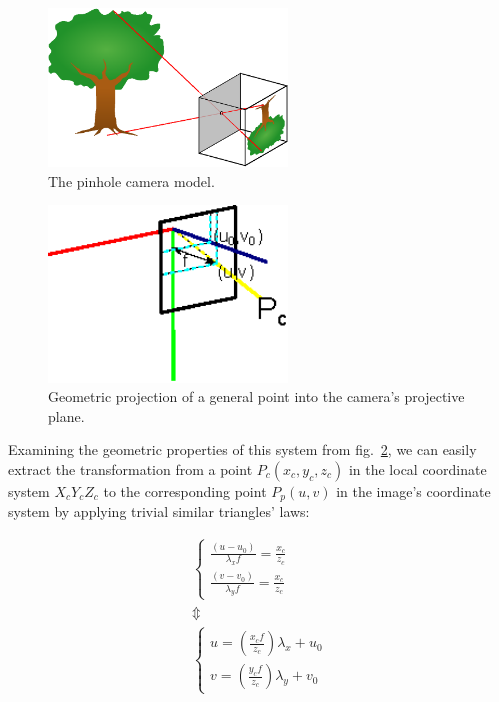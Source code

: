 \begin{figure}[htbp]
\centering
\includegraphics[width=2.5in]{./Graphics/pinhole_camera}
\caption{The pinhole camera model. \label{fig:pinhole_camera}}
\end{figure}
\begin{figure}[htbp]
\centering
\includegraphics[width=2.5in]{./Graphics/camera_intrinsics}
\caption{Geometric projection of a general point into the camera's projective
plane. \label{fig:intrinsics}}
\end{figure}
Examining the geometric properties of this system from fig.~\ref{fig:intrinsics}, we can easily extract the
transformation from a point $P_c(x_c,y_c,z_c)$ in the local coordinate system
$X_cY_cZ_c$ to the corresponding point $P_p(u,v)$ in the image's coordinate
system by applying trivial similar triangles' laws:

\[
  \begin{array}{c}
    \left\{\begin{array}{c}
    \frac{(u-u_0)}{\lambda _x f}=\frac{x_c}{z_c} \\
    \frac{(v-v_0)}{\lambda _y f}=\frac{x_c}{z_c}
  \end{array}
  \right. \\
  \Updownarrow \\
  \left\{\begin{array}{c}
      u=\left(\frac{x_c f}{z_c}\right) \lambda _x+u_0 \\
      v=\left(\frac{y_c f}{z_c}\right) \lambda _y+v_0
    \end{array}
    \right. 
  \end{array}
\]

